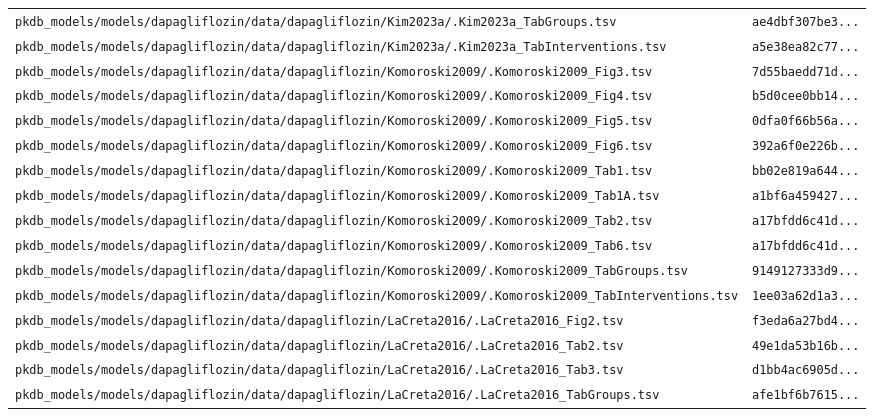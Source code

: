 \begin{longtable}{ll}
\texttt{pkdb\_models/models/dapagliflozin/data/dapagliflozin/Kim2023a/.Kim2023a\_TabGroups.tsv} & \texttt{ae4dbf307be3...} \\
\texttt{pkdb\_models/models/dapagliflozin/data/dapagliflozin/Kim2023a/.Kim2023a\_TabInterventions.tsv} & \texttt{a5e38ea82c77...} \\
\texttt{pkdb\_models/models/dapagliflozin/data/dapagliflozin/Komoroski2009/.Komoroski2009\_Fig3.tsv} & \texttt{7d55baedd71d...} \\
\texttt{pkdb\_models/models/dapagliflozin/data/dapagliflozin/Komoroski2009/.Komoroski2009\_Fig4.tsv} & \texttt{b5d0cee0bb14...} \\
\texttt{pkdb\_models/models/dapagliflozin/data/dapagliflozin/Komoroski2009/.Komoroski2009\_Fig5.tsv} & \texttt{0dfa0f66b56a...} \\
\texttt{pkdb\_models/models/dapagliflozin/data/dapagliflozin/Komoroski2009/.Komoroski2009\_Fig6.tsv} & \texttt{392a6f0e226b...} \\
\texttt{pkdb\_models/models/dapagliflozin/data/dapagliflozin/Komoroski2009/.Komoroski2009\_Tab1.tsv} & \texttt{bb02e819a644...} \\
\texttt{pkdb\_models/models/dapagliflozin/data/dapagliflozin/Komoroski2009/.Komoroski2009\_Tab1A.tsv} & \texttt{a1bf6a459427...} \\
\texttt{pkdb\_models/models/dapagliflozin/data/dapagliflozin/Komoroski2009/.Komoroski2009\_Tab2.tsv} & \texttt{a17bfdd6c41d...} \\
\texttt{pkdb\_models/models/dapagliflozin/data/dapagliflozin/Komoroski2009/.Komoroski2009\_Tab6.tsv} & \texttt{a17bfdd6c41d...} \\
\texttt{pkdb\_models/models/dapagliflozin/data/dapagliflozin/Komoroski2009/.Komoroski2009\_TabGroups.tsv} & \texttt{9149127333d9...} \\
\texttt{pkdb\_models/models/dapagliflozin/data/dapagliflozin/Komoroski2009/.Komoroski2009\_TabInterventions.tsv} & \texttt{1ee03a62d1a3...} \\
\texttt{pkdb\_models/models/dapagliflozin/data/dapagliflozin/LaCreta2016/.LaCreta2016\_Fig2.tsv} & \texttt{f3eda6a27bd4...} \\
\texttt{pkdb\_models/models/dapagliflozin/data/dapagliflozin/LaCreta2016/.LaCreta2016\_Tab2.tsv} & \texttt{49e1da53b16b...} \\
\texttt{pkdb\_models/models/dapagliflozin/data/dapagliflozin/LaCreta2016/.LaCreta2016\_Tab3.tsv} & \texttt{d1bb4ac6905d...} \\
\texttt{pkdb\_models/models/dapagliflozin/data/dapagliflozin/LaCreta2016/.LaCreta2016\_TabGroups.tsv} & \texttt{afe1bf6b7615...} \\

\end{longtable}

